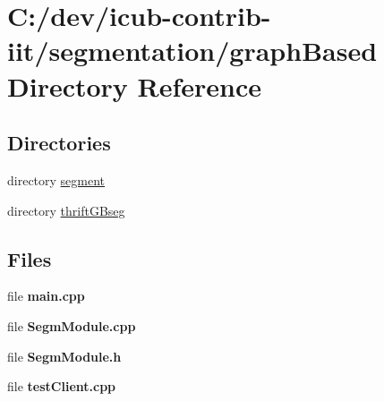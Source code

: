 \section{C\+:/dev/icub-\/contrib-\/iit/segmentation/graph\+Based Directory Reference}
\label{dir_8d097e0c609b911a89b6e04a4838e3c2}
\subsection*{Directories}
\begin{DoxyCompactItemize}
\item 
directory \hyperlink{dir_8a973a77effdd5e8e5ebda63e606cd67}{segment}
\item 
directory \hyperlink{dir_bbf36cd9c3e396ab0a5619e1e6da30b4}{thrift\+G\+Bseg}
\end{DoxyCompactItemize}
\subsection*{Files}
\begin{DoxyCompactItemize}
\item 
file {\bfseries main.\+cpp}
\item 
file {\bfseries Segm\+Module.\+cpp}
\item 
file {\bfseries Segm\+Module.\+h}
\item 
file {\bfseries test\+Client.\+cpp}
\end{DoxyCompactItemize}
